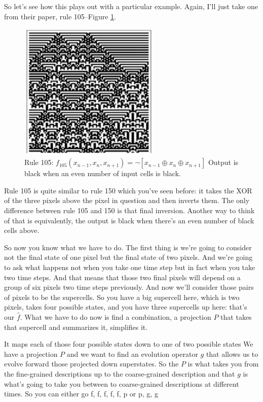 \documentclass[]{article}
\newcommand*\xor{\oplus}
\begin{document}
So let's see how this plays out with a particular example. Again, I'll just take one from their paper, rule 105--Figure \ref{fig:cellular-automaton-rule-4a}.

\begin{figure}[H]
	\begin{center}
		\caption[Rule 105]{Rule 105: $f_{105}(x_{n-1},x_n,x_{n+1})=\neg [x_{n-1} \xor x_n \xor x_{n+1}]$ Output is black when an even number of input cells is black.}\label{fig:cellular-automaton-rule-4a}
		\includegraphics[width=0.6\textwidth]{cellular-automaton-rule-4}
	\end{center}
\end{figure}
 Rule 105 is quite similar to rule 150 which you've seen before: it takes the XOR of the three pixels above the pixel in question and then inverts them.
The only difference between rule 105 and 150 is that final inversion.
Another way to think of that is equivalently, the output is black when there's an even number of black cells above.

So now you know what we have to do. The first thing is we're going to consider not the final state of one pixel but the final state of two pixels. And we're going to ask what happens not when you take one time step but in fact when you take two time steps.
And that means that those two final pixels will depend on a group of six pixels
two time steps previously.
And now we'll consider those pairs of pixels to be the supercells.
So you have a big supercell here, which is two pixels, takes four possible states,
and you have three supercells up here: that's our $\hat{f}$.
What we have to do now is find a combination, a projection
$P$ that takes that supercell and summarizes it, simplifies it.

It maps each of those four possible states down to one of two possible states
We have a projection $P$ and we want to
find an evolution operator $g$
that allows us to evolve forward
those projected down superstates.
So the $P$ is what takes you from the
fine-grained descriptions up
to the coarse-grained description
and that $g$ is what's going to take you
between to coarse-grained descriptions
at different times.
So you can either go
f, f, f, f, f, p or
p, g, g
\end{document}
